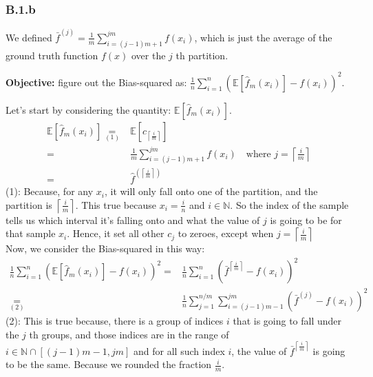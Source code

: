 \documentclass[]{article}
\begin{document}
    \subsubsection*{B.1.b}
        \hspace{1.1em}
        We defined $\bar{f}^{(j)}=\frac{1}{m}\sum_{i = (j - 1)m + 1}^{jm}f\left(x_i\right)$, which is just the average of the ground truth function $f(x)$ over the $j$ th partition. 
        \par
        \textbf{Objective: } figure out the Bias-squared as: $\frac{1}{n}\sum_{i = 1}^{n}\left(\mathbb{E}\left[\hat{f}_m(x_i)\right] - f(x_i)\right)^2$. 
        \par
        Let's start by considering the quantity: $\mathbb{E}\left[\hat{f}_m(x_i)\right]$. 
        \begin{align*}\tag{B.1.b.1}\label{eqn:B.1.b.1}
            \mathbb{E}\left[\hat{f}_m(x_i)\right] \underset{(1)}{=}&
            \mathbb{E}\left[c_{\left\lceil\frac{i}{m}\right\rceil}\right]
            \\
            =& 
            \frac{1}{m}\sum_{i=(j - 1)m + 1}^{jm}f(x_i) \quad \text{where } j = 
            \left\lceil\frac{i}{m}\right\rceil
            \\
            =&
            \hat{f}^{(\left\lceil\frac{i}{m}\right\rceil) }
        \end{align*}
        (1): Because, for any $x_i$, it will only fall onto one of the partition, and the partition is $\left\lceil \frac{i}{m}\right\rceil$. This true because $x_i = \frac{i}{n}$ and $i\in\mathbb{N}$. So the index of the sample tells us which interval it's falling onto and what the value of $j$ is going to be for that sample $x_i$. Hence, it set all other $c_j$ to zeroes, except when $j = \left\lceil\frac{i}{m}\right\rceil$
        \\[1em]
        Now, we consider the Bias-squared in this way: 
        \begin{align*}\tag{B.1.b.2}\label{eqn:B.1.b.2}
            \frac{1}{n}\sum_{i = 1}^{n}\left(\mathbb{E}\left[\hat{f}_m(x_i)\right] - f(x_i)\right)^2
            =&
            \frac{1}{n}\sum_{i = 1}^{n}\left(
                \bar{f}^{\left\lceil\frac{i}{m}\right\rceil}
                -
                f(x_i)
            \right)^2
            \\
            \underset{(2)}{=}&
            \frac{1}{n}\sum_{j = 1}^{n/m}\sum_{i = (j - 1)m - 1}^{jm}\left(
                \bar{f}^{(j)} - f(x_i)
            \right)^2
        \end{align*}
        (2): This is true because, there is a group of indices $i$ that is going to fall under the $j$ th groups, and those indices are in the range of $i \in \mathbb{N}\cap [(j - 1)m - 1, jm]$ and for all such index $i$, the value of $\bar{f}^{\left\lceil\frac{i}{m}\right\rceil}$ is going to be the same. Because we rounded the fraction $\frac{i}{m}$.
\end{document}
